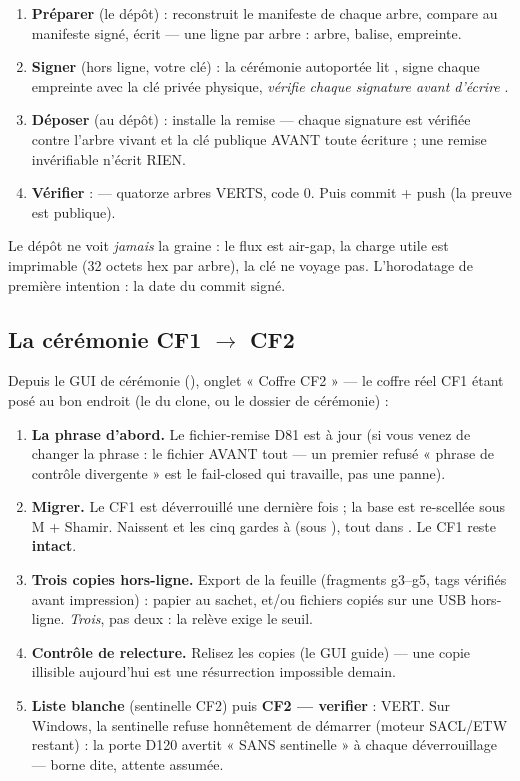 \begin{enumerate}
\item \textbf{Préparer} (le dépôt) :  reconstruit le
manifeste de chaque arbre, compare au manifeste signé, écrit  —
une ligne par arbre : arbre, balise, empreinte.
\item \textbf{Signer} (hors ligne, votre clé) : la cérémonie autoportée
 lit , signe chaque
empreinte avec la clé privée physique, \emph{vérifie chaque signature avant
d'écrire} .
\item \textbf{Déposer} (au dépôt) :  installe la remise —
chaque signature est vérifiée contre l'arbre vivant et la clé publique AVANT toute
écriture ; une remise invérifiable n'écrit RIEN.
\item \textbf{Vérifier} :  — quatorze arbres VERTS, code 0.
Puis commit + push (la preuve est publique).
\end{enumerate}

Le dépôt ne voit \emph{jamais} la graine : le flux est air-gap, la charge utile est
imprimable (32 octets hex par arbre), la clé ne voyage pas. L'horodatage de première
intention : la date du commit signé.

\subsection{La cérémonie CF1 $\to$ CF2}\label{sec:cercf2}

Depuis le GUI de cérémonie (), onglet « Coffre CF2 » — le
coffre réel CF1 étant posé au bon endroit (le  du clone, ou
le dossier de cérémonie) :

\begin{enumerate}
\item \textbf{La phrase d'abord.} Le fichier-remise D81 est à jour (si vous venez de
changer la phrase : le fichier AVANT tout — un premier  refusé « phrase
de contrôle divergente » est le fail-closed qui travaille, pas une panne).
\item \textbf{Migrer.} Le CF1 est déverrouillé une dernière fois ; la base est
re-scellée sous M + Shamir. Naissent  et les cinq gardes
 à  (sous ), tout dans . Le CF1
reste \textbf{intact}.
\item \textbf{Trois copies hors-ligne.} Export de la feuille (fragments g3--g5, tags
vérifiés avant impression) : papier au sachet, et/ou fichiers  copiés sur
une USB hors-ligne. \emph{Trois}, pas deux : la relève exige le seuil.
\item \textbf{Contrôle de relecture.} Relisez les copies (le GUI guide) — une copie
illisible aujourd'hui est une résurrection impossible demain.
\item \textbf{Liste blanche} (sentinelle CF2) puis \textbf{CF2 — verifier} : VERT.
Sur Windows, la sentinelle refuse honnêtement de démarrer (moteur SACL/ETW restant) :
la porte D120 avertit « SANS sentinelle » à chaque déverrouillage — borne dite,
attente assumée.
\end{enumerate}

